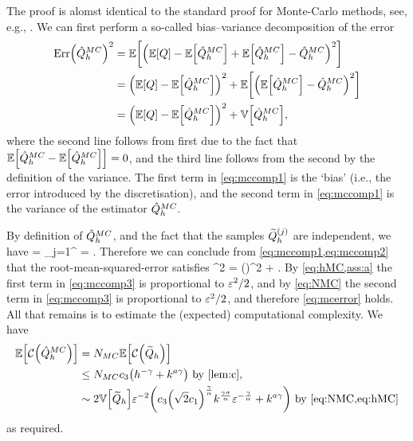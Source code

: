 The proof is alomst identical to the standard proof for Monte-Carlo methods, see, e.g., \cite[Section 2.1]{ClGiScTe:11}. We can first perform a so-called bias--variance decomposition of the error
\begin{align}
\err{\QhatMC}^2 &=  \EXP{ \mleft(\EXP{Q}-\EXP{\QhatMC} + \EXP{\QhatMC} - \QhatMC\mright)^2} \nonumber\\
&= \mleft(\EXP{Q}-\EXP{\QhatMC}\mright)^2 + \EXP{\mleft(\EXP{\QhatMC} - \QhatMC\mright)^2} \nonumber\\
&= \mleft(\EXP{Q} - \EXP{\QhatMC}\mright)^2+\VAR{\QhatMC},\label{eq:mccomp1}
\end{align}
where the second line follows from first due to the fact that $\EXP{\QhatMC - \EXP{\QhatMC}} = 0$, and the third line follows from the second by the definition of the variance. The first term in \cref{eq:mccomp1} is the `bias' (i.e., the error introduced by the discretisation), and the second term in \cref{eq:mccomp1} is the variance of the estimator $\hat{Q}^{MC}_{h}.$

By definition of $\hat{Q}^{MC}_{h}$, and the fact that the samples $\widetilde{Q}_{h}^{(j)}$ are independent, we have
\beq\label{eq:mccomp2}
\VAR{\QhatMC} = \sum_{j=1}^{\NMC}\VAR{\Qhtildesj} =  \VAR{\Qhtilde}.
\eeq
Therefore we can conclude from \cref{eq:mccomp1,eq:mccomp2} that the root-mean-squared-error satisfies
\beq\label{eq:mccomp3}
\err{\QhatMC}^2 = \mleft(\mright)^2 + \VAR{\Qhtilde}.
\eeq
By \cref{eq:hMC,ass:a} the first term in \cref{eq:mccomp3} is proportional to $\varepsilon^2/2$, and by \cref{eq:NMC} the second term in \cref{eq:mccomp3} is proportional to $\varepsilon^2/2$, and therefore \cref{eq:mcerror} holds. All that remains is to estimate the (expected) computational complexity. We have
\begin{align*}
  \EXP{\Cost{\QhatMC}} &= \NMC \EXP{\Cost{\Qhtilde}}\\
  &\leq \NMC \cth \mleft(h^{-\gamma} + k^{a\gamma}\mright) \text{ by \cref{lem:c},}\\
  &\sim 2\VAR{\Qhtilde}\eps^{-2} \mleft(\cth \mleft(\sqrt{2} \co\mright)^{\frac\gamma\alpha}k^{\frac{\gamma\sigma}{\alpha}}\eps^{-\frac\gamma\alpha} + k^{a\gamma}\mright)\text{ by \cref{eq:NMC,eq:hMC}}
\end{align*}
as required.
\epf

